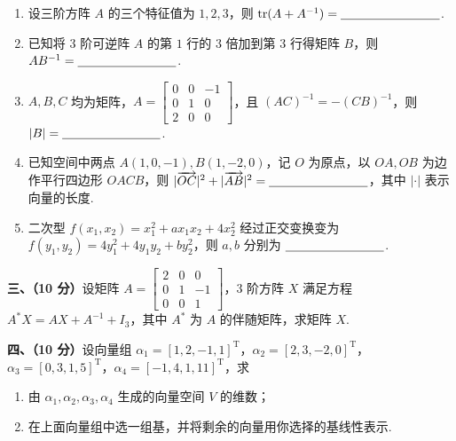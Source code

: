 \documentclass[a4paper,11pt]{ctexart}
\newcommand{\tr}{\operatorname{tr}}
\newcommand{\T}{\mathrm{T}}
\newcommand{\blank}[1][2.8cm]{\underline{\hspace{#1}}}
\begin{document}
\begin{enumerate}[label=\arabic*., leftmargin=2em, itemsep=1.2em, topsep=0.6em]
  \item 设三阶方阵 $A$ 的三个特征值为 $1, 2, 3$，则 $\tr(A + A^{-1}) = \blank$.

  \item 已知将 $3$ 阶可逆阵 $A$ 的第 $1$ 行的 $3$ 倍加到第 $3$ 行得矩阵 $B$，则 $AB^{-1} = \blank$.

  \item $A, B, C$ 均为矩阵，$A = \begin{bmatrix} 0 & 0 & -1 \\ 0 & 1 & 0 \\ 2 & 0 & 0 \end{bmatrix}$，且 $(AC)^{-1} = -(CB)^{-1}$，则 $|B| = \blank$.

  \item 已知空间中两点 $A(1, 0, -1), B(1, -2, 0)$，记 $O$ 为原点，以 $OA, OB$ 为边作平行四边形 $OACB$，则 $|\overrightarrow{OC}|^2 + |\overrightarrow{AB}|^2 = \blank$，其中 $|\cdot|$ 表示向量的长度.

  \item 二次型 $f(x_1, x_2) = x_1^2 + a x_1 x_2 + 4 x_2^2$ 经过正交变换变为 $f(y_1, y_2) = 4 y_1^2 + 4 y_1 y_2 + b y_2^2$，则 $a, b$ 分别为 $\blank$.
\end{enumerate}

\newpage

\textbf{三、（10 分）}设矩阵 $A = \begin{bmatrix} 2 & 0 & 0 \\ 0 & 1 & -1 \\ 0 & 0 & 1 \end{bmatrix}$，$3$ 阶方阵 $X$ 满足方程 $A^* X = A X + A^{-1} + I_3$，其中 $A^*$ 为 $A$ 的伴随矩阵，求矩阵 $X$.

\vspace{0.8em}

\textbf{四、（10 分）}设向量组 $\alpha_1 = [1, 2, -1, 1]^{\T}$，$\alpha_2 = [2, 3, -2, 0]^{\T}$，$\alpha_3 = [0, 3, 1, 5]^{\T}$，$\alpha_4 = [-1, 4, 1, 11]^{\T}$，求
\begin{enumerate}[label=(\arabic*), leftmargin=2.4em, itemsep=0.25em, topsep=0.3em]
  \item 由 $\alpha_1, \alpha_2, \alpha_3, \alpha_4$ 生成的向量空间 $V$ 的维数；
  \item 在上面向量组中选一组基，并将剩余的向量用你选择的基线性表示.
\end{enumerate}

\vspace{0.8em}
\end{document}
